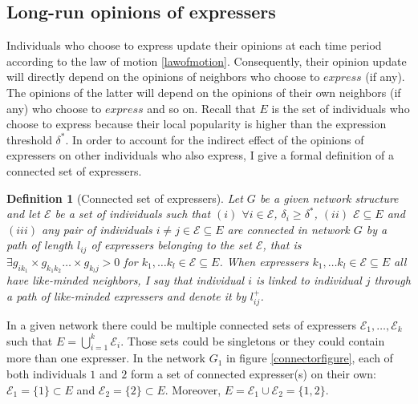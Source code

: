 \documentclass{article}
\newtheorem{definition}{Definition}
\begin{document}
\subsection{Long-run opinions of expressers}
\label{LRexpressers}

Individuals who choose to express update their opinions at each time period according to the law of motion \eqref{lawofmotion}. Consequently, their opinion update will directly depend on the opinions of neighbors who choose to $express$ (if any). The opinions of the latter will depend on the opinions of their own neighbors (if any) who choose to $express$ and so on. Recall that $E$ is the set of individuals who choose to express because their local popularity is higher than the expression threshold $\delta^{*}$. In order to account for the indirect effect of the opinions of expressers on other individuals who also express, I give a formal definition of a connected set of expressers. 

\begin{definition}[Connected set of expressers]
Let $G$ be a given network structure and let $\mathcal{E}$ be a set of individuals such that $(i)$ $\forall i \in \mathcal{E}$, $\delta_i \geq \delta^{*}$, $(ii)$  $\mathcal{E} \subseteq E$  and $(iii)$ any pair of individuals $i \neq j \in \mathcal{E} \subseteq E$ are connected in network $G$ by a path of length $l_{ij}$ of expressers belonging to the set $\mathcal{E}$,  that is $\exists g_{ik_1} \times g_{k_1 k_2} \ldots \times g_{k_l j} >0$ for $k_1, \ldots k_l \in \mathcal{E} \subseteq E$. When expressers $k_1, \ldots k_l \in \mathcal{E} \subseteq E$ all have like-minded neighbors, I say that individual $i$ is linked to individual $j$ through a path of like-minded expressers and denote it by $l_{ij}^{+}$. 
\label{connectedexpressers}
\end{definition}



In a given network there could be multiple connected sets of expressers $\mathcal{E}_1, \ldots, \mathcal{E}_k$ such that $E= \bigcup_{i=1}^{k} \mathcal{E}_i$. Those sets could be singletons or they could contain more than one expresser. In the network $G_{1}$ in figure \ref{connectorfigure}, each of both individuals $1$ and $2$ form a set of connected expresser(s) on their own: $\mathcal{E}_1=\{ 1\} \subset E$ and $\mathcal{E}_2=\{ 2\} \subset E$. Moreover, $E= \mathcal{E}_1 \cup \mathcal{E}_2 = \{ 1,2\}$. \\

\end{document}
